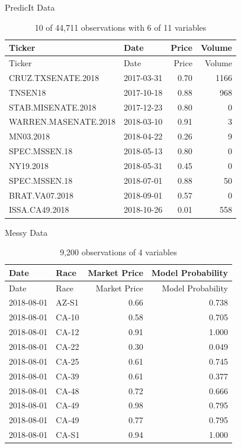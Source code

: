 \documentclass[ignorenonframetext,]{beamer}
\begin{document}
\begin{frame}{PredicIt Data}
\protect\hypertarget{predicit-data}{}

\begin{longtable}[]{@{}llrr@{}}
\caption{10 of 44,711 observations with 6 of 11
variables}\tabularnewline
\toprule
Ticker & Date & Price & Volume\tabularnewline
\midrule
\endfirsthead
\toprule
Ticker & Date & Price & Volume\tabularnewline
\midrule
\endhead
CRUZ.TXSENATE.2018 & 2017-03-31 & 0.70 & 1166\tabularnewline
TNSEN18 & 2017-10-18 & 0.88 & 968\tabularnewline
STAB.MISENATE.2018 & 2017-12-23 & 0.80 & 0\tabularnewline
WARREN.MASENATE.2018 & 2018-03-10 & 0.91 & 3\tabularnewline
MN03.2018 & 2018-04-22 & 0.26 & 9\tabularnewline
SPEC.MSSEN.18 & 2018-05-13 & 0.80 & 0\tabularnewline
NY19.2018 & 2018-05-31 & 0.45 & 0\tabularnewline
SPEC.MSSEN.18 & 2018-07-01 & 0.88 & 50\tabularnewline
BRAT.VA07.2018 & 2018-09-01 & 0.57 & 0\tabularnewline
ISSA.CA49.2018 & 2018-10-26 & 0.01 & 558\tabularnewline
\bottomrule
\end{longtable}

\end{frame}

\begin{frame}{Messy Data}
\protect\hypertarget{messy-data}{}

\begin{longtable}[]{@{}llrr@{}}
\caption{9,200 observations of 4 variables}\tabularnewline
\toprule
Date & Race & Market Price & Model Probability\tabularnewline
\midrule
\endfirsthead
\toprule
Date & Race & Market Price & Model Probability\tabularnewline
\midrule
\endhead
2018-08-01 & AZ-S1 & 0.66 & 0.738\tabularnewline
2018-08-01 & CA-10 & 0.58 & 0.705\tabularnewline
2018-08-01 & CA-12 & 0.91 & 1.000\tabularnewline
2018-08-01 & CA-22 & 0.30 & 0.049\tabularnewline
2018-08-01 & CA-25 & 0.61 & 0.745\tabularnewline
2018-08-01 & CA-39 & 0.61 & 0.377\tabularnewline
2018-08-01 & CA-48 & 0.72 & 0.666\tabularnewline
2018-08-01 & CA-49 & 0.98 & 0.795\tabularnewline
2018-08-01 & CA-49 & 0.77 & 0.795\tabularnewline
2018-08-01 & CA-S1 & 0.94 & 1.000\tabularnewline
\bottomrule
\end{longtable}

\end{frame}
\end{document}
